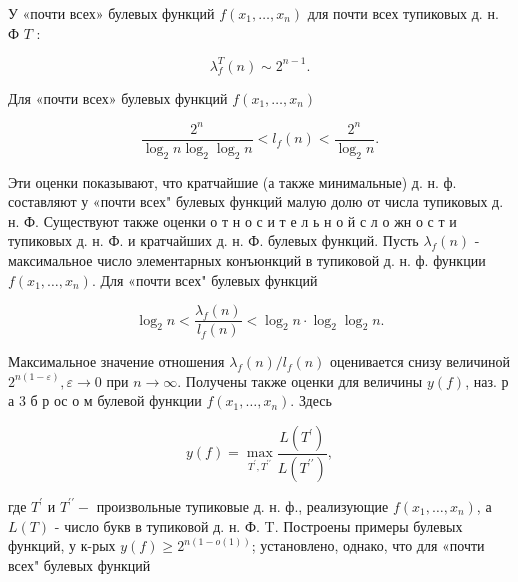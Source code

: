 \documentclass[10pt]{article}
\begin{document}
У «почти всех» булевых функций $f\left(x_{1}, \ldots, x_{n}\right)$ для почти всех тупиковых д. н. Ф $T$ :



\[

\lambda_{f}^{T}(n) \sim 2^{n-1} .

\]



Для «почти всех» булевых функций $f\left(x_{1}, \ldots, x_{n}\right)$



\[

\frac{2^{n}}{\log _{2} n \log _{2} \log _{2} n}<l_{f}(n)<\frac{2^{n}}{\log _{2} n} .

\]



Эти оценки показывают, что кратчайшие (а также минимальные) д. н. ф. составляют у «почти всех" булевых функций малую долю от числа тупиковых д. н. Ф. Существуют также оценки о т н о с и т е л ь н о й с л о жн о с т и тупиковых д. н. Ф. и кратчайших д. н. Ф. булевых функций. Пусть $\lambda_{f}(n)$ - максимальное число элементарных конъюнкций в тупиковой д. н. ф. функции $f\left(x_{1}, \ldots, x_{n}\right)$. Для «почти всех" булевых функций



\[

\log _{2} n<\frac{\lambda_{f}(n)}{l_{f}(n)}<\log _{2} n \cdot \log _{2} \log _{2} n .

\]



Максимальное значение отношения $\lambda_{f}(n) / l_{f}(n)$ оценивается снизу величиной $2^{n(1-\varepsilon)}, \varepsilon \rightarrow 0$ при $n \rightarrow \infty$. Получены также оценки для величины $y(f)$, наз. р а 3 б р ос о м булевой функции $f\left(x_{1}, \ldots, x_{n}\right)$. Здесь



\[

y(f)=\max _{T^{\prime}, T^{\prime \prime}} \frac{L\left(T^{\prime}\right)}{L\left(T^{\prime \prime}\right)},

\]



где $T^{\prime}$ и $T^{\prime \prime}-$ произвольные тупиковые д. н. ф., реализующие $f\left(x_{1}, \ldots, x_{n}\right)$, а $L(T)$ - число букв в тупиковой д. н. Ф. T. Построены примеры булевых функций, у к-рых $y(f) \geqslant 2^{n(1-o(1))}$; установлено, однако, что для «почти всех" булевых функций
\end{document}
